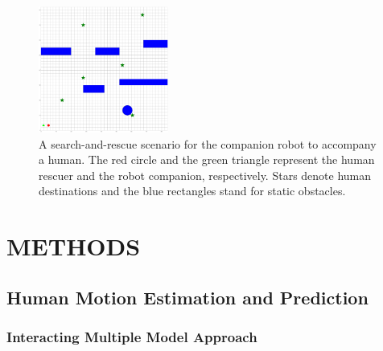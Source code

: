 \documentclass[letterpaper, 10 pt, conference]{ieeeconf}
\begin{document}
	
	\begin{figure}
		\centering		
		\includegraphics[width=0.38\textwidth]{figures/sim_traj_init}		
		\caption{A search-and-rescue scenario for the companion robot to accompany a human. The red circle and the green triangle represent the human rescuer and the robot companion, respectively. Stars denote human destinations and the blue rectangles stand for static obstacles.}
		\label{fig:ref_traj_init}
	\end{figure}
	
	
	\section{METHODS} \label{sec:framework}
	
	\subsection{Human Motion Estimation and Prediction}\label{subsec:human_track}
	\subsubsection{Interacting Multiple Model Approach}\label{subsec:imm}
	
\end{document}
